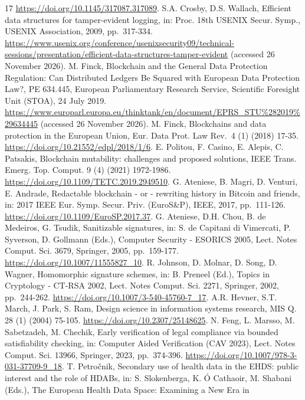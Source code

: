 \documentclass[5p,twocolumn]{elsarticle}
\begin{document}
\begin{thebibliography}{17}
\url{https://doi.org/10.1145/317087.317089}.
 S.A. Crosby, D.S. Wallach, Efficient data structures for
tamper-evident logging, in: Proc. 18th USENIX Secur. Symp., USENIX
Association, 2009, pp.~317-334.
\url{https://www.usenix.org/conference/usenixsecurity09/technical-sessions/presentation/efficient-data-structures-tamper-evident}
(accessed 26 November 2026).
 M. Finck, Blockchain and the General Data Protection Regulation:
Can Distributed Ledgers Be Squared with European Data Protection Law?,
PE 634.445, European Parliamentary Research Service, Scientific
Foresight Unit (STOA), 24 July 2019.
\url{https://www.europarl.europa.eu/thinktank/en/document/EPRS_STU\%282019\%29634445}
(accessed 26 November 2026).
 M. Finck, Blockchains and data protection in the European
Union, Eur. Data Prot. Law Rev.~4 (1) (2018) 17-35.
\url{https://doi.org/10.21552/edpl/2018/1/6}.
 E. Politou, F. Casino, E. Alepis, C. Patsakis, Blockchain
mutability: challenges and proposed solutions, IEEE Trans. Emerg. Top.
Comput. 9 (4) (2021) 1972-1986.
\url{https://doi.org/10.1109/TETC.2019.2949510}.
 G. Ateniese, B. Magri, D. Venturi, E. Andrade, Redactable
blockchain - or - rewriting history in Bitcoin and friends, in: 2017
IEEE Eur. Symp. Secur. Priv. (EuroS\&P), IEEE, 2017, pp.~111-126.
\url{https://doi.org/10.1109/EuroSP.2017.37}.
 G. Ateniese, D.H. Chou, B. de Medeiros, G. Tsudik, Sanitizable
signatures, in: S. de Capitani di Vimercati, P. Syverson, D. Gollmann
(Eds.), Computer Security - ESORICS 2005, Lect. Notes Comput. Sci. 3679,
Springer, 2005, pp.~159-177. \url{https://doi.org/10.1007/11555827_10}.
 R. Johnson, D. Molnar, D. Song, D. Wagner, Homomorphic
signature schemes, in: B. Preneel (Ed.), Topics in Cryptology - CT-RSA
2002, Lect. Notes Comput. Sci. 2271, Springer, 2002, pp.~244-262.
\url{https://doi.org/10.1007/3-540-45760-7_17}.
 A.R. Hevner, S.T. March, J. Park, S. Ram, Design science in
information systems research, MIS Q. 28 (1) (2004) 75-105.
\url{https://doi.org/10.2307/25148625}.
 N. Feng, L. Marsso, M. Sabetzadeh, M. Chechik, Early
verification of legal compliance via bounded satisfiability checking,
in: Computer Aided Verification (CAV 2023), Lect. Notes Comput. Sci.
13966, Springer, 2023, pp.~374-396.
\url{https://doi.org/10.1007/978-3-031-37709-9_18}.
 T. Petročnik, Secondary use of health data in the EHDS: public
interest and the role of HDABs, in: S. Slokenberga, K. Ó Cathaoir, M.
Shabani (Eds.), The European Health Data Space: Examining a New Era in

\end{thebibliography}
\end{document}
